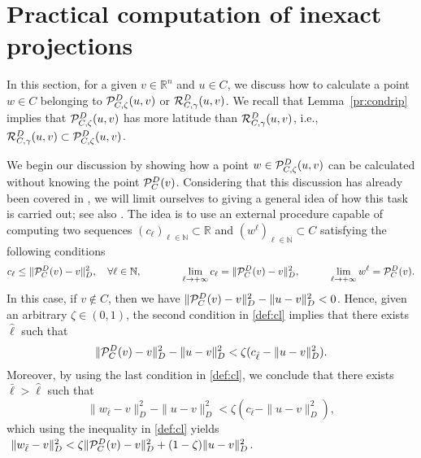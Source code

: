 \section{Practical computation of  inexact projections} \label{sec:pcip}

In this section,  for a given  $v\in {\mathbb R}^n$ and   $u \in C$, we discuss how to calculate a  point  $w \in C$ belonging to  ${\cal P}_{C, \zeta}^{D}(u,v)$ or ${\cal R}_{C, \gamma}^{D}(u,v)$.  We recall that  Lemma~\ref{pr:condrip} implies that ${\cal P}_{C, \zeta}^{D}(u,v)$ has  more latitude than ${\cal R}_{C, \gamma}^{D}(u,v)$, i.e., ${\cal R}_{C, \gamma}^{D}(u,v) \subset {\cal P}_{C, \zeta}^{D}(u,v)$.

We begin our discussion by showing how a point $w\in {\cal P}_{C, \zeta}^{D}(u,v)$ can be calculated  without knowing the point ${\cal P}_{C}^{D}(v)$.   Considering that this discussion has already been covered in \cite[Section~3,  Algorithm 3.1]{BirginMartinezRaydan2003},  we will limit ourselves to giving a general idea of how this task is carried out; see also \cite[Section~5.1]{Bonettini2016}.   The idea is to use an external procedure capable of computing two  sequences  $(c_\ell)_{\ell\in\mathbb{N}}\subset \mathbb{R}$  and   $(w^\ell)_{\ell\in\mathbb{N}}\subset C$ satisfying the following  conditions
\begin{equation}\label{def:cl}
	c_\ell \leq \|{\cal P}_{C}^{D}(v)-v\|_D^2,\quad  \forall\ell\in\mathbb{N}, \qquad \qquad \lim_{\ell \to +\infty} c_\ell = \|{\cal P}_{C}^{D}(v)-v\|_D^2, \qquad \quad   \lim_{\ell\to +\infty} w^\ell = {\cal P}_{C}^{D}(v).
\end{equation}
In this case,   if  $v\notin C$, then   we have $ \|{\cal P}_{C}^{D}(v)-v\|_D^2- \|u-v\|_D^2<0$. Hence,   given an arbitrary $ \zeta\in (0,1)$,  the second condition in \eqref{def:cl} implies  that   there exists $\hat{\ell}$ such that
$$
	\|{\cal P}_{C}^{D}(v)-v\|_D^2- \|u-v\|_D^2< \zeta (c_{\hat{\ell}}- \|u-v\|_D^2).
$$
Moreover, by using the last condition in \eqref{def:cl}, we conclude that   there exists $\bar{\ell}>\hat{\ell}$ such that
\begin{equation}\label{def:clsc}
	\|w_{\bar{\ell}}-v\|_D^2- \|u-v\|_D^2< \zeta (c_{\bar{\ell}}- \|u-v\|_D^2),
\end{equation}
which using   the inequality  in \eqref{def:cl} yields  $ \ \|w_{\bar{\ell}}-v\|_D^2<  \zeta \|{\cal P}_{C}^{D}(v)-v\|_D^2  +(1-\zeta) \|u-v\|_D^2$.
